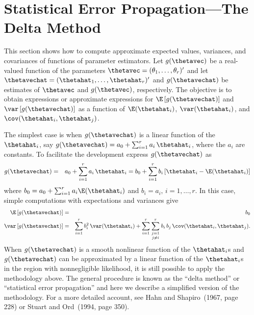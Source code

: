 \section{Statistical Error Propagation---The Delta Method}
\label{asection:delta.method}
This section shows how to compute approximate expected values,
variances, and covariances of functions of 
parameter estimators.
Let $g(\thetavec)$ be a real-valued function of
the parameters $\thetavec=(\theta_{1}, \ldots,
\theta_{r})'$ and let $\thetavechat=(\thetahat_{1}, \ldots,
\thetahat_{r})'$ and $g(\thetavechat)$ be
estimates of $\thetavec$ and $g(\thetavec)$, respectively.
The objective is to obtain 
expressions or approximate expressions for $\E \left [
				    g(\thetavechat)
				   \right ]
				$
and				$\var \left [
				    g(\thetavechat)
				   \right ]
				$
as a function of $\E(\thetahat_{i})$, 
$\var(\thetahat_{i})$, and $\cov(\thetahat_{i}, \thetahat_{j})$.

The simplest case is when $g(\thetavechat)$ is a linear
function of the $\thetahat_{i}$, say 
$g(\thetavechat)=a_{0}+\sum_{i=1}^{r} a_{i} \, \thetahat_{i}$, where
the $a_{i}$ are constants.
To facilitate the development express $g(\thetavechat)$ as 
\begin{eqnarray}
g(\thetavechat)&=&a_{0}+\sum_{i=1}^{r} a_{i} \, \thetahat_{i}
=b_{0}+\sum_{i=1}^{r} b_{i} \left [\thetahat_{i} - \E(\thetahat_{i}) \right ]
\label{equation:linear.combination}
\end{eqnarray}
where 
$
b_{0}=a_{0}+\sum_{i=1}^{r} a_{i} \E(\thetahat_{i})
$ and 
$
b_{i}=a_{i}, \,i=1,\ldots,r.
$
In this case, simple computations with expectations
and variances give
\begin{eqnarray*}
\E \left [g(\thetavechat) \right ]&=&b_{0}
\\
\var \left[g(\thetavechat) \right ] &=&
\sum_{i=1}^{r} b_{i}^{2} \, \var(\thetahat_{i}) 
	+ \sum_{i=1}^{r} 
	   \sum_
            {\textstyle {j=1 \atop j\ne i }}^{r} b_{i}\, b_{j}\, \cov(\thetahat_{i}, \thetahat_{j}).
\end{eqnarray*}
When $g(\thetavechat)$ is a smooth nonlinear function of 
the $\thetahat_{i}$s and $g(\thetavechat)$ can be 
approximated by a linear function of
the $\thetahat_{i}$s in the region with 
nonnegligible likelihood,
it is still possible to apply the methodology above.
The general procedure is known as the ``delta method''
or ``statistical error propagation''
and here we describe a simplified version of the methodology.
For a more detailed account, see Hahn
and Shapiro~(1967, page 228) or Stuart and Ord~(1994,
page 350).

